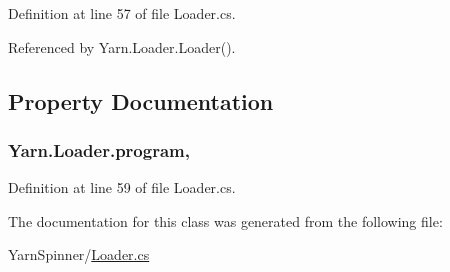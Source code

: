 Definition at line 57 of file Loader.\-cs.



Referenced by Yarn.\-Loader.\-Loader().



\subsection{Property Documentation}
\hypertarget{a00133_a6d8296076823c0c082df9024367f4860}{
\subsubsection[{program}]{ Yarn.\-Loader.\-program\hspace{0.3cm}{\ttfamily [get]}, {\ttfamily [set]}}}\label{a00133_a6d8296076823c0c082df9024367f4860}


Definition at line 59 of file Loader.\-cs.



The documentation for this class was generated from the following file\-:\begin{DoxyCompactItemize}
\item 
Yarn\-Spinner/\hyperlink{a00312}{Loader.\-cs}\end{DoxyCompactItemize}
